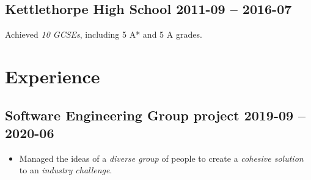     \subsection{Kettlethorpe High School
       \hfill 2011-09 -- 2016-07}
       Achieved \emph{10 GCSEs}, including 5 A* and 5 A grades\footnotemark[2].
\section{Experience}
    \subsection{Software Engineering Group project
    \hfill 2019-09 -- 2020-06}
        \begin{itemize}
            \item Managed the ideas of a \emph{diverse group} of people to
                create a \emph{cohesive solution} to an \emph{industry
                challenge}.
        \end{itemize}
